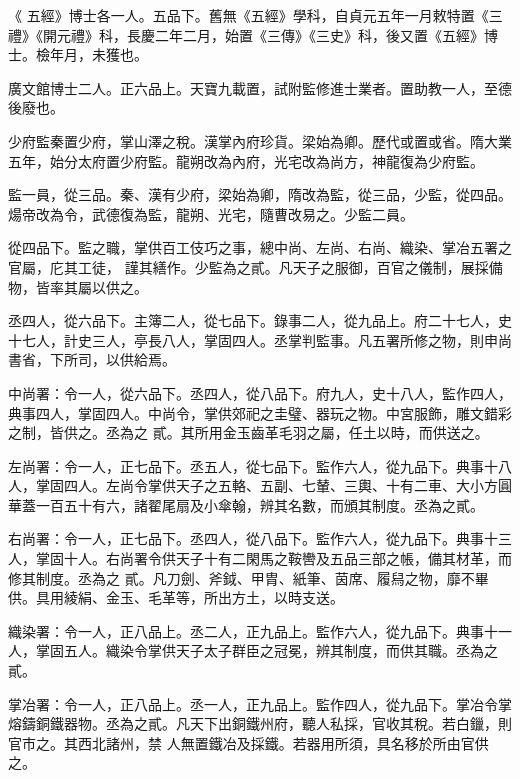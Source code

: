 \begin{pinyinscope}
 《
 五經》博士各一人。五品下。舊無《五經》學科，自貞元五年一月敕特置《三禮》《開元禮》科，長慶二年二月，始置《三傳》《三史》科，後又置《五經》博士。檢年月，未獲也。



 廣文館博士二人。正六品上。天寶九載置，試附監修進士業者。置助教一人，至德後廢也。



 少府監秦置少府，掌山澤之稅。漢掌內府珍貨。梁始為卿。歷代或置或省。隋大業五年，始分太府置少府監。龍朔改為內府，光宅改為尚方，神龍復為少府監。



 監一員，從三品。秦、漢有少府，梁始為卿，隋改為監，從三品，少監，從四品。煬帝改為令，武德復為監，龍朔、光宅，隨曹改易之。少監二員。



 從四品下。監之職，掌供百工伎巧之事，總中尚、左尚、右尚、織染、掌冶五署之官屬，庀其工徒，
 謹其繕作。少監為之貳。凡天子之服御，百官之儀制，展採備物，皆率其屬以供之。



 丞四人，從六品下。主簿二人，從七品下。錄事二人，從九品上。府二十七人，史十七人，計史三人，亭長八人，掌固四人。丞掌判監事。凡五署所修之物，則申尚書省，下所司，以供給焉。



 中尚署：令一人，從六品下。丞四人，從八品下。府九人，史十八人，監作四人，典事四人，掌固四人。中尚令，掌供郊祀之圭璧、器玩之物。中宮服飾，雕文錯彩之制，皆供之。丞為之
 貳。其所用金玉齒革毛羽之屬，任土以時，而供送之。



 左尚署：令一人，正七品下。丞五人，從七品下。監作六人，從九品下。典事十八人，掌固四人。左尚令掌供天子之五輅、五副、七輦、三輿、十有二車、大小方圓華蓋一百五十有六，諸翟尾扇及小傘翰，辨其名數，而頒其制度。丞為之貳。



 右尚署：令一人，正七品下。丞四人，從八品下。監作六人，從九品下。典事十三人，掌固十人。右尚署令供天子十有二閑馬之鞍轡及五品三部之帳，備其材革，而修其制度。丞為之
 貳。凡刀劍、斧鉞、甲胄、紙筆、茵席、履舄之物，靡不畢供。具用綾絹、金玉、毛革等，所出方土，以時支送。



 織染署：令一人，正八品上。丞二人，正九品上。監作六人，從九品下。典事十一人，掌固五人。織染令掌供天子太子群臣之冠冕，辨其制度，而供其職。丞為之貳。



 掌冶署：令一人，正八品上。丞一人，正九品上。監作四人，從九品下。掌冶令掌熔鑄銅鐵器物。丞為之貳。凡天下出銅鐵州府，聽人私採，官收其稅。若白鑞，則官市之。其西北諸州，禁
 人無置鐵冶及採鐵。若器用所須，具名移於所由官供之。




\end{pinyinscope}
